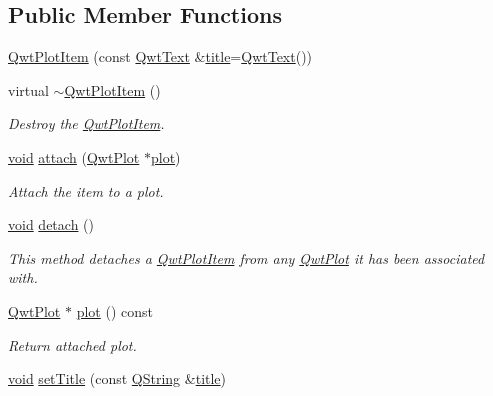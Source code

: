 \subsection*{Public Member Functions}
\begin{DoxyCompactItemize}
\item 
\hyperlink{class_qwt_plot_item_a5d892ac856fb9176515c5f2d806161dc}{Qwt\-Plot\-Item} (const \hyperlink{class_qwt_text}{Qwt\-Text} \&\hyperlink{class_qwt_plot_item_a3859d011b670b5f89e45d1ccef9206f7}{title}=\hyperlink{class_qwt_text}{Qwt\-Text}())
\item 
virtual \hyperlink{class_qwt_plot_item_a282a1d0424a06737f80e1fe83ccf7a0c}{$\sim$\-Qwt\-Plot\-Item} ()
\begin{DoxyCompactList}\small\item\em Destroy the \hyperlink{class_qwt_plot_item}{Qwt\-Plot\-Item}. \end{DoxyCompactList}\item 
\hyperlink{group___u_a_v_objects_plugin_ga444cf2ff3f0ecbe028adce838d373f5c}{void} \hyperlink{class_qwt_plot_item_aeb2f676533ccae3436bf578824e2165e}{attach} (\hyperlink{class_qwt_plot}{Qwt\-Plot} $\ast$\hyperlink{class_qwt_plot_item_a4c99653a14a49ad94d466168d06e97b9}{plot})
\begin{DoxyCompactList}\small\item\em Attach the item to a plot. \end{DoxyCompactList}\item 
\hyperlink{group___u_a_v_objects_plugin_ga444cf2ff3f0ecbe028adce838d373f5c}{void} \hyperlink{class_qwt_plot_item_ab2bbee6dbe36a5f1d0ce853ac66716a6}{detach} ()
\begin{DoxyCompactList}\small\item\em This method detaches a \hyperlink{class_qwt_plot_item}{Qwt\-Plot\-Item} from any \hyperlink{class_qwt_plot}{Qwt\-Plot} it has been associated with. \end{DoxyCompactList}\item 
\hyperlink{class_qwt_plot}{Qwt\-Plot} $\ast$ \hyperlink{class_qwt_plot_item_a4c99653a14a49ad94d466168d06e97b9}{plot} () const 
\begin{DoxyCompactList}\small\item\em Return attached plot. \end{DoxyCompactList}\item 
\hyperlink{group___u_a_v_objects_plugin_ga444cf2ff3f0ecbe028adce838d373f5c}{void} \hyperlink{class_qwt_plot_item_a1b74686181ab6dd5033917123c7db30f}{set\-Title} (const \hyperlink{group___u_a_v_objects_plugin_gab9d252f49c333c94a72f97ce3105a32d}{Q\-String} \&\hyperlink{class_qwt_plot_item_a3859d011b670b5f89e45d1ccef9206f7}{title})

\end{DoxyCompactItemize}
